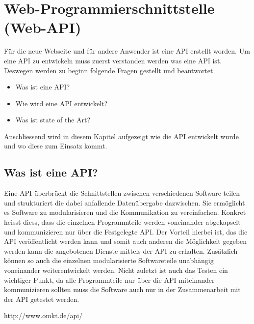 
\section{ Web-Programmierschnittstelle (Web-API)}
Für die neue Webseite und für andere Anwender ist eine API erstellt worden. Um eine API zu entwickeln muss zuerst verstanden werden was eine API ist. Deswegen werden zu beginn folgende Fragen gestellt und beantwortet.
\begin{itemize}
\item Was ist eine API?
\item Wie wird eine API entwickelt?
\item Was ist state of the Art?
\end{itemize}

Anschliessend wird in diesem Kapitel aufgezeigt wie die API entwickelt wurde und wo diese zum Einsatz kommt.

\subsection{Was ist eine API?}
Eine API überbrückt die Schnittstellen zwischen verschiedenen Software teilen und strukturiert die dabei anfallende Datenübergabe dazwischen. Sie ermöglicht es Software zu modularisieren und die Kommunikation zu vereinfachen. Konkret heisst diess, dass die einzelnen Programmteile werden voneinander abgekapselt und kommunizieren nur über die Festgelegte API. Der Vorteil hierbei ist, das die API veröffentlicht werden kann und somit auch anderen die Möglichkeit gegeben werden kann die angebotenen Dienste mittels der API zu erhalten. Zusätzlich können so auch die einzelnen modularisierte Softwareteile unabhängig voneinander weiterentwickelt werden. Nicht zuletzt ist auch das Testen ein wichtiger Punkt, da alle Programmteile nur über die API miteinander kommunizieren sollten muss die Software auch nur in der Zusammenarbeit mit der API getestet werden.

http://www.omkt.de/api/

